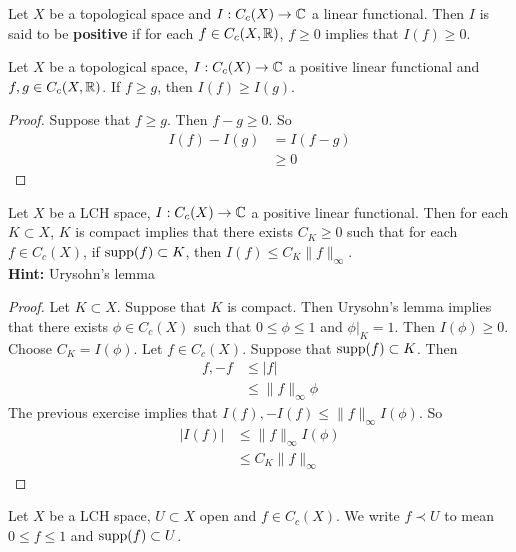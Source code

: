 \documentclass{book}
\begin{document}
	\begin{defn}  
	Let $X$ be a topological space and $I: C_c(X) \rightarrow \mathbb{C}$ a linear functional. Then $I$ is said to be \textbf{positive} if for each $f \in C_c(X, \mathbb{R})$, $f \geq 0 $ implies that $I(f) \geq 0$.
	\end{defn}
	
	\begin{ex}  
	Let $X$ be a topological space, $I: C_c(X) \rightarrow \mathbb{C}$ a positive linear functional and $f,g \in C_c(X, \mathbb{R})$. If $f \geq g$, then $I(f) \geq I (g)$.  
	\end{ex}	
	
	\begin{proof}
	Suppose that $f \geq g$. Then $f - g \geq 0$. So 
	\begin{align*}
	I(f) - I(g) 
	&= I(f -g) \\
	&\geq 0
	\end{align*}
	\end{proof}
	
	
	
	\begin{ex}  
	Let $X$ be a LCH space, $I: C_c(X) \rightarrow \mathbb{C}$ a positive linear functional. Then for each $K \subset X$, $K $ is compact implies that there exists $C_K \geq 0$ such that for each $f \in C_c(X)$, if $\operatorname{supp}(f) \subset K$, then $I(f) \leq C_K \|f\|_{\infty}$.\\
	\textbf{Hint:} Urysohn's lemma 
	\end{ex}
	
	\begin{proof}
	Let $K \subset X$. Suppose that $K$ is compact. Then Urysohn's lemma implies that there exists $\phi \in C_c(X)$ such that $0 \leq \phi \leq 1$ and $\phi|_K = 1$. Then $I(\phi) \geq 0$. Choose $C_K = I(\phi)$. Let $f \in C_c(X)$. Suppose that $\operatorname{supp}(f) \subset K$. Then 
	\begin{align*}
	f,-f 
	&\leq |f| \\
	& \leq \|f\|_{\infty} \phi
	\end{align*}
	The previous exercise implies that $I(f), -I(f) \leq \|f\|_{\infty} I(\phi)$. So 
	\begin{align*}
	|I(f)| 
	&\leq \|f\|_{\infty} I(\phi) \\
	&\leq  C_K \|f\|_{\infty}  
	\end{align*}
	\end{proof}
	
	\begin{note}
	Let $X$ be a LCH space, $U \subset X$ open and $f \in C_c(X)$. We write $f \prec U$ to mean $0 \leq f \leq 1$ and $\operatorname{supp}(f) \subset U$. 
	\end{note}
	
\end{document}
